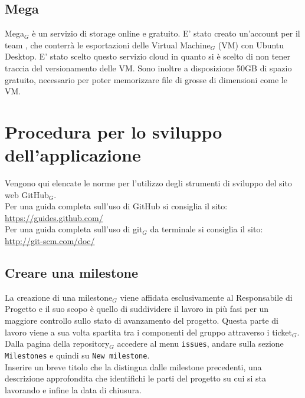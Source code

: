 \subsection{Mega}
Mega$_G$ è un servizio di storage online e gratuito. E' stato creato un'account per il team \gruppo, che conterrà le esportazioni delle Virtual Machine$_G$ (VM) con Ubuntu Desktop. E' stato scelto questo servizio cloud in quanto si è scelto di non tener traccia del versionamento delle VM. Sono inoltre a disposizione 50GB di spazio gratuito, necessario per poter memorizzare file di grosse di dimensioni come le VM.

\newpage
\section{Procedura per lo sviluppo dell'applicazione}
Vengono qui elencate le norme per l'utilizzo degli strumenti di sviluppo del sito web GitHub$_{G}$. \\
Per una guida completa sull'uso di GitHub si consiglia il sito: \\
\url{https://guides.github.com/}\\
Per una guida completa sull'uso di git$_{G}$ da terminale si consiglia il sito: \\
\url{http://git-scm.com/doc/}

\subsection{Creare una milestone}
La creazione di una milestone$_{G}$ viene affidata esclusivamente al Responsabile di Progetto e il suo scopo è quello di suddividere il lavoro in più fasi per un maggiore controllo sullo stato di avanzamento del progetto. Questa parte di lavoro viene a sua volta spartita tra i componenti del gruppo attraverso i ticket$_{G}$. \\
    Dalla pagina della repository$_{G}$ accedere al menu \texttt{issues}, andare sulla sezione \texttt{Milestones} e quindi su \texttt{New milestone}.\\
    Inserire un breve titolo che la distingua dalle milestone precedenti, una descrizione approfondita che identifichi le parti del progetto su cui si sta lavorando e infine la data di chiusura.

